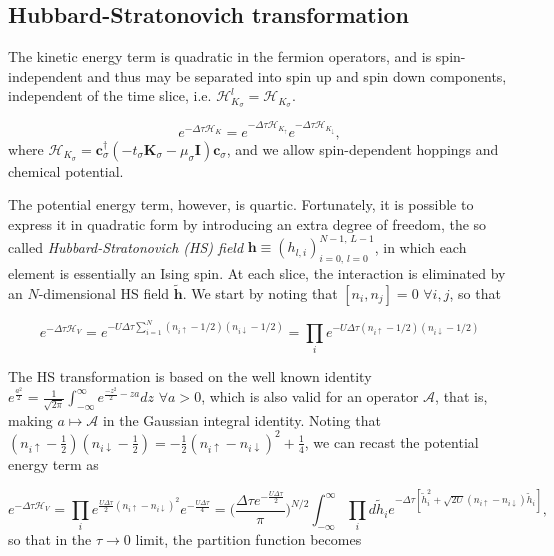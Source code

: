 \subsection{Hubbard-Stratonovich transformation}\label{subsec:HStransf}

The kinetic energy term is quadratic in the fermion operators, and is spin-independent and thus may be separated into spin up and spin down components, independent of the time slice, i.e. $\mathcal{H}_{K_\sigma}^l = \mathcal{H}_{K_\sigma}$.

\begin{equation}
e^{-\Delta\tau \mathcal{H}_K} = e^{-\Delta\tau \mathcal{H}_{K_\uparrow}} e^{-\Delta\tau \mathcal{H}_{K_\downarrow}} ,
\end{equation}
where $\mathcal{H}_{K_\sigma} = \bm c_\sigma^\dagger (-t_\sigma \bm K_\sigma - \mu_\sigma \bm I )  \bm c_\sigma$, and we allow spin-dependent hoppings and chemical potential.

The potential energy term, however, is quartic.
Fortunately, it is possible to express it in quadratic form by introducing an extra degree of freedom, the so called \emph{Hubbard-Stratonovich (HS) field} $\bm h \equiv (h_{l, i})_{i=0,\, l= 0}^{N-1, \, L - 1}$, in which each element is essentially an Ising spin.
At each slice, the interaction is eliminated by an $N$-dimensional HS field $\widetilde{\bm h}$.
We start by noting that $[ n_i , n_j ] = 0 \,\, \forall i, j$, so that

\begin{equation}\label{eq:Hint}
e^{-\Delta\tau \mathcal{H}_V} = e^{-U \Delta\tau \sum_{i=1}^N (n_{i\uparrow} - 1/2 ) (n_{i\downarrow} - 1/2 )} = \prod_i e^{-U \Delta\tau (n_{i\uparrow} - 1/2 ) (n_{i\downarrow} - 1/2 )}
\end{equation}

The HS transformation is based on the well known identity 
$
e^{ \frac{a^2}{2}} = \frac{1}{\sqrt{2\pi}} \int_{-\infty}^{\infty} e^{\frac{-z^2}{2}  - za } dz
$ 
$ \forall a > 0$, 
which is also valid for an operator $\mathcal{A}$, that is, making $a \mapsto \mathcal{A}$ in the Gaussian integral identity.
Noting that $(n_{i\uparrow} - \frac{1}{2} ) (n_{i\downarrow} - \frac{1}{2} ) = -\frac{1}{2} ( n_{i\uparrow} - n_{i\downarrow} )^2 + \frac{1}{4}$, we can recast the potential energy term as

\begin{equation}
e^{-\Delta\tau \mathcal{H}_V} = \prod_i e^{ \frac{U \Delta \tau}{2} ( n_{i\uparrow} - n_{i\downarrow} )^2 } e^{- \frac{U \Delta \tau}{4}}
=\bigg( \frac{\Delta \tau e^{- \frac{U \Delta \tau}{2}}}{\pi} \bigg)^{N/2} \int_{-\infty}^\infty \prod_i d \widetilde{h}_i e^{-\Delta \tau [ \widetilde{h}_i^2 + \sqrt{2U} ( n_{i\uparrow} - n_{i\downarrow} ) \widetilde{h}_i ]} ,
\end{equation}
so that in the $\tau \rightarrow 0$ limit, the partition function becomes

